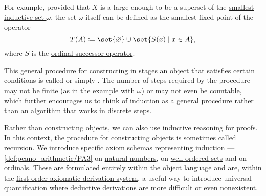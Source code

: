 \begin{remark}
  For example, provided that \( X \) is a large enough to be a superset of the \hyperref[def:smallest_inductive_set]{smallest inductive set \( \omega \)}, the set \( \omega \) itself can be defined as the smallest fixed point of the operator
  \begin{equation*}
    T(A) \coloneqq \set{ \varnothing } \cup \set{ S(x) \given x \in A },
  \end{equation*}
  where \( S \) is the \hyperref[def:ordinal_successor_operator]{ordinal successor operator}.

  This general procedure for constructing in stages an object that satisfies certain conditions is called  or simply . The number of steps required by the procedure may not be finite (as in the example with \( \omega \)) or may not even be countable, which further encourages us to think of induction as a general procedure rather than an algorithm that works in discrete steps.

  Rather than constructing objects, we can also use inductive reasoning for proofs. In this context, the procedure for constructing objects is sometimes called recursion. We introduce specific axiom schemas representing induction --- \ref{def:peano_arithmetic/PA3} on \hyperref[def:set_of_natural_numbers]{natural numbers},  on \hyperref[def:well_ordered_set]{well-ordered sets} and  on \hyperref[def:ordinal]{ordinals}. These are formulated entirely within the object language and are, within the \hyperref[def:first_order_axiomatic_derivation_system]{first-order axiomatic derivation system}, a useful way to introduce universal quantification where deductive derivations are more difficult or even nonexistent.
\end{remark}

